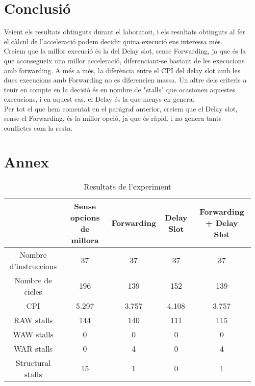 \documentclass{article}
\begin{document}
\section{Conclusió}
Veient els resultats obtinguts durant el laboratori, i els resultats obtinguts al fer el càlcul de l'acceleració podem decidir quina execució ens interessa més.\\
Creiem que la millor execució és la del Delay slot, sense Forwarding, ja que és la que aconsegueix una millor acceleració, diferenciant-se bastant de les execucions amb forwarding. A més a més, la diferència entre el CPI del delay slot amb les dues execucions amb Forwarding no es diferencien massa. Un altre dels criteris a tenir en compte en la decisió és en nombre de "stalls" que ocasionen aquestes execucions, i en aquest cas, el Delay és la que menys en genera.\\
Per tot el que hem comentat en el paràgraf anterior, creiem que el Delay slot, sense el Forwarding, és la millor opció, ja que és ràpid, i no genera tants conflictes com la resta.

\newpage
\section{Annex}


\begin{table}[!h]
\hskip-2.0cm
\begin{tabular}{|c|c|c|c|c|}

\hline
 & Sense opcions de millora &Forwarding  &Delay Slot  &Forwarding + Delay Slot   \\
 \hline
 Nombre d'instruccions &37  &37  &37 &37  \\
 \hline
 Nombre de cicles &196               &139  &152  &139   \\
 \hline
 CPI &5.297               &3.757  &4.108  &3.757   \\
 \hline
 RAW stalls &144 &140  &111  &115   \\
 \hline
 WAW stalls &0 &0 &0 &0   \\
 \hline
 WAR stalls &0 &4 &0 &4   \\
 \hline
 Structural stalls &15 &1 &0 &1\\
 \hline 
\end{tabular}
\caption{Resultats de l'experiment}
\label{tab:results}
\end{table}
\end{document}
